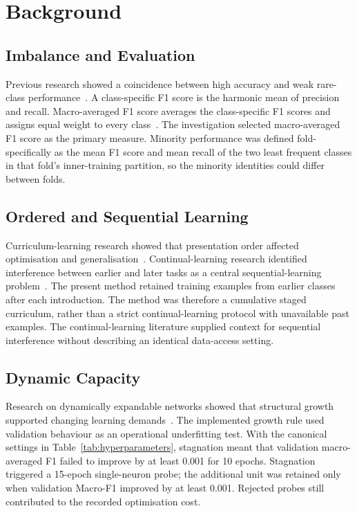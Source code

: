 \documentclass[conference,10pt]{IEEEtran}
\begin{document}
\section{Background}

\subsection{Imbalance and Evaluation}
Previous research showed a coincidence between high accuracy and weak rare-class performance~\cite{he2009learning}. A class-specific F1 score is the harmonic mean of precision and recall. Macro-averaged F1 score averages the class-specific F1 scores and assigns equal weight to every class~\cite{sokolova2009systematic}. The investigation selected macro-averaged F1 score as the primary measure. Minority performance was defined fold-specifically as the mean F1 score and mean recall of the two least frequent classes in that fold's inner-training partition, so the minority identities could differ between folds.

\subsection{Ordered and Sequential Learning}
Curriculum-learning research showed that presentation order affected optimisation and generalisation~\cite{bengio2009curriculum}. Continual-learning research identified interference between earlier and later tasks as a central sequential-learning problem~\cite{parisi2019continual}. The present method retained training examples from earlier classes after each introduction. The method was therefore a cumulative staged curriculum, rather than a strict continual-learning protocol with unavailable past examples. The continual-learning literature supplied context for sequential interference without describing an identical data-access setting.

\subsection{Dynamic Capacity}
Research on dynamically expandable networks showed that structural growth supported changing learning demands~\cite{yoon2018den}. The implemented growth rule used validation behaviour as an operational underfitting test. With the canonical settings in Table~\ref{tab:hyperparameters}, stagnation meant that validation macro-averaged F1 failed to improve by at least 0.001 for 10 epochs. Stagnation triggered a 15-epoch single-neuron probe; the additional unit was retained only when validation Macro-F1 improved by at least 0.001. Rejected probes still contributed to the recorded optimisation cost.
\end{document}
